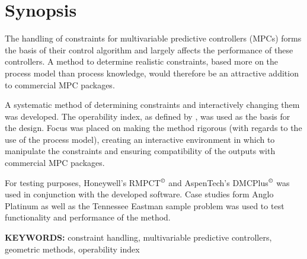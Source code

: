 \chapter*{Synopsis}
The handling of constraints for multivariable predictive controllers (MPCs)
forms the basis of their control algorithm and largely affects the performance
of these controllers. A method to determine realistic constraints, based more
on the process model than process knowledge, would therefore be an attractive
addition to commercial MPC packages.

A systematic method of determining constraints and interactively changing them
was developed. The operability index, as defined by \citet{vinsonartoi}, was
used as the basis for the design. Focus was placed on making the method
rigorous (with regards to the use of the process model), creating an interactive
environment in which to manipulate the constraints and ensuring compatibility
of the outputs with commercial MPC packages.

For testing purposes, Honeywell's RMPCT$^{\copyright}$ and AspenTech's 
DMCPlus$^{\copyright}$ was used in conjunction with the developed software. Case 
studies form Anglo Platinum as well as the Tennessee Eastman sample problem was
used to test functionality and performance of the method. 
\bigskip

\noindent \textbf{KEYWORDS:} constraint handling, multivariable predictive
controllers, geometric methods, operability index


